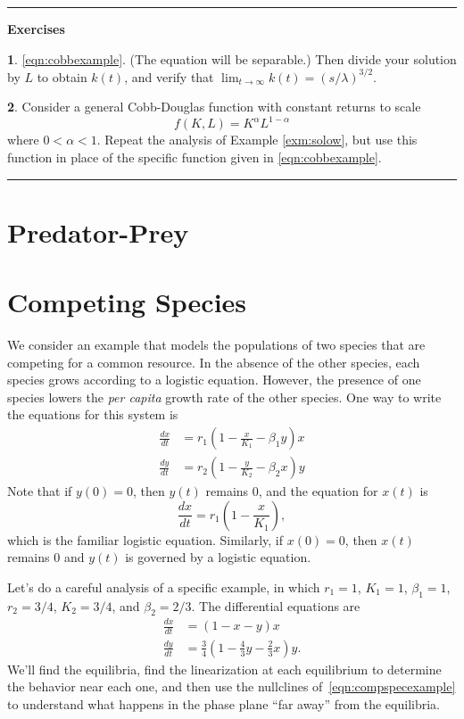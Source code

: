 \documentclass[reqno]{immbook}
\numberwithin{equation}{chapter}
\numberwithin{question}{section}
\numberwithin{theorem}{chapter}
\numberwithin{figure}{chapter}
\theoremstyle{definition}
\newtheorem{exercise}{}[section]
\newenvironment{exercises}%
{%
\medskip\hrule\medskip\noindent\textbf{Exercises}%
}%
{%
\medskip\hrule
}
\begin{document}
\begin{exercises}
\begin{exercise}
\eqref{eqn:cobbexample}.  (The equation will be separable.)
Then divide your solution by $L$ to obtain $k(t)$,
and verify that $\lim_{t\rightarrow\infty} k(t) =
\left(s/\lambda\right)^{3/2}$.
\end{exercise}
\begin{exercise}
Consider a general Cobb-Douglas function with
constant returns to scale
\begin{equation}
   f(K,L) = K^{\alpha}L^{1-\alpha}
\end{equation}
where $0 < \alpha < 1$.
Repeat the analysis of Example \ref{exm:solow},
but use this function in place of the
specific function given in \eqref{eqn:cobbexample}.
\end{exercise}
\end{exercises}
\newpage
%
\section{Predator-Prey}
%
\newpage
%
\section{Competing Species}
%
We consider an example that models the populations
of two species that are competing for a common resource.
In the absence of the other species, each species
grows according to a logistic equation.
However, the presence of one species lowers
the \emph{per capita} growth rate of the other species.
One way to write the equations for this system
is
\begin{equation}
\begin{split}
  \frac{dx}{dt} & = r_1\left(1-\frac{x}{K_1}-\beta_1 y\right)x \\
  \frac{dy}{dt} & = r_2\left(1-\frac{y}{K_2}-\beta_2 x\right)y
\end{split}
\end{equation}
Note that if $y(0)=0$, then $y(t)$ remains $0$, and
the equation for $x(t)$ is
\begin{equation}
    \frac{dx}{dt} = r_1 \left(1-\frac{x}{K_1}\right),
\end{equation}
which is the familiar logistic equation.
Similarly, if $x(0)=0$, then $x(t)$ remains $0$ and
$y(t)$ is governed by a logistic equation.

Let's do a careful analysis of a specific example,
in which $r_1 = 1$, $K_1 = 1$, $\beta_1 = 1$, 
$r_2 = 3/4$, $K_2 = 3/4$, and $\beta_2 = 2/3$.
The differential equations are
\begin{equation}
\begin{split}
  \frac{dx}{dt} & = (1-x-y)x \\
  \frac{dy}{dt} & = \frac{3}{4}\left(1 -\frac{4}{3}y - \frac{2}{3}x\right)y .
\end{split}
\label{eqn:compspecexample}
\end{equation}
We'll find the equilibria, find the linearization at each
equilibrium to determine the behavior near each one, and then
use the nullclines of~\eqref{eqn:compspecexample} to understand
what happens in the phase plane ``far away'' from the equilibria.
\end{document}
